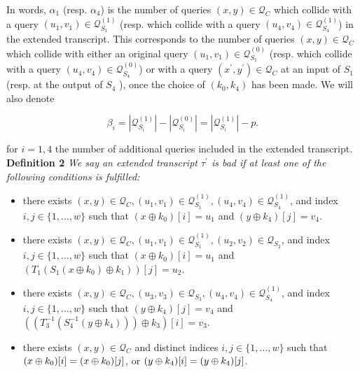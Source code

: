 In words, $\alpha_1$ (resp. $\alpha_4$) is the number of queries $(x, y) \in \mathcal{Q}_{C}$ which collide with a query $\left(u_{1}, v_{1}\right) \in \mathcal{Q}_{S_{1}}^{(1)}$ (resp. which collide with a query $\left(u_{4}, v_{4}\right) \in \mathcal{Q}_{S_{4}}^{(1)}$) in the extended transcript. This corresponds to the number of queries $(x, y) \in \mathcal{Q}_{C}$ which collide with either an original query $\left(u_{1}, v_{1}\right) \in \mathcal{Q}_{S_{1}}^{(0)}$ (resp. which collide with a query $\left(u_{4}, v_{4}\right) \in \mathcal{Q}_{S_{4}}^{(0)}$) or with a query $\left(x^{\prime}, y^{\prime}\right) \in \mathcal{Q}_{C}$ at an input of $S_1$ (resp. at the output of $S_4$ ), once the choice of $\left(k_{0}, k_{4}\right)$  has been made. We will also denote

$$
\beta_{i}=\left|\mathcal{Q}_{S_{i}}^{(1)}\right|-\left|\mathcal{Q}_{S_{i}}^{(0)}\right|=\left|\mathcal{Q}_{S_{i}}^{(1)}\right|-p.
$$

for $i=1, 4$ the number of additional queries included in the extended transcript.\\

\noindent \textbf{Definition 2} \emph{ We say an extended transcript $\tau^{\prime}$ is bad if at least one of the following conditions is fulfilled:}

\begin{itemize}
  \item[\bone]
  there exists $(x, y) \in \mathcal{Q}_{C}, \left(u_{1}, v_{1}\right) \in \mathcal{Q}_{S_{1}}^{(1)}, \left(u_{4}, v_{4}\right) \in \mathcal{Q}_{S_{4}}^{(1)}$, and index $i, j \in \{1, \ldots, w\}$ such that $\left(x \oplus k_{0}\right)[i]=u_1$ and $\left(y \oplus k_{4}\right)[j]=v_4$.
  \item[\btwo]
  there exists $(x,y) \in \mathcal{Q}_{C}, \left(u_{1}, v_{1}\right) \in \mathcal{Q}_{S_{1}}^{(1)}, \left(u_{2}, v_{2}\right) \in \mathcal{Q}_{S_{2}}$, and index $i, j \in \{1, \ldots, w\}$ such that $\left(x \oplus k_{0}\right)[i]=u_1$ and $\left(T_{1}\left(S_{1}\left(x \oplus k_{0}\right) \oplus k_{1}\right)\right)[j]=u_2$.
  \item[\bthree]
  there exists $(x,y) \in \mathcal{Q}_{C}, \left(u_{3}, v_{3}\right) \in \mathcal{Q}_{S_{3}}, \left(u_{4}, v_{4}\right) \in \mathcal{Q}_{S_{4}}^{(1)}$, and index $i, j \in \{1, \ldots, w\}$ such that $\left(y \oplus k_{4}\right)[j]=v_4$ and $\left(\left(T_{3}^{-1}\left(S_{4}^{-1}\left(y \oplus k_{4}\right)\right)\right) \oplus k_{3}\right)[i]=v_3$.
  \item[\bfour] 
  	there exists $(x,y) \in \mathcal{Q}_{C}$ and distinct indices $i, j \in \{1, \ldots, w\}$ such that $(x\oplus k_0)[i]=(x\oplus k_0)[j]$, or $(y\oplus k_4)[i]=(y\oplus k_4)[j]$.
\end{itemize}

